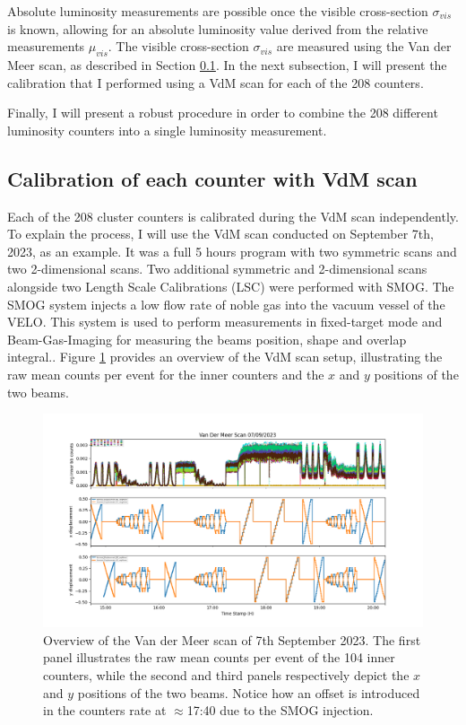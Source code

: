 Absolute luminosity measurements are possible once the visible cross-section $\sigma_{vis}$ is known, allowing for an absolute luminosity value derived from the relative measurements $\mu_{vis}$. The visible cross-section $\sigma_{vis}$ are measured using the Van der Meer scan, as described in Section \ref{sec:calibration_vdm}. In the next subsection, I will present the calibration that I performed using a VdM scan for each of the 208 counters.

Finally, I will present a robust procedure in order to combine the 208 different luminosity counters into a single luminosity measurement.

\subsection{Calibration of each counter with VdM scan}\label{sec:calibration_vdm}
Each of the 208 cluster counters is calibrated during the VdM scan independently. To explain the process, I will use the VdM scan conducted on September 7th, 2023, as an example.
It was a full 5 hours program with two symmetric scans and two 2-dimensional scans. Two additional symmetric and 2-dimensional scans alongside two Length Scale Calibrations (LSC) were performed with SMOG. The SMOG system\cite{CERN-LHCC-2019-005} injects a low flow rate of noble gas into the vacuum vessel of the VELO. This system is used to perform measurements in fixed-target mode and Beam-Gas-Imaging for measuring the beams position, shape and overlap integral\cite{Coombs:2767576}.. Figure \ref{fig:inner_vdm_sep} provides an overview of the VdM scan setup, illustrating the raw mean counts per event for the inner counters and the $x$ and $y$ positions of the two beams.

\begin{figure}
    \centering
    \includegraphics[width=\textwidth]{figures/inner_counts_bkg.png}
    \caption{Overview of the Van der Meer scan of 7th September 2023. The first panel illustrates the raw mean counts per event of the 104 inner counters, while the second and third panels respectively depict the $x$ and $y$ positions of the two beams. Notice how an offset is introduced in the counters rate at $\approx$17:40 due to the SMOG injection.}
    \label{fig:inner_vdm_sep}
\end{figure}


